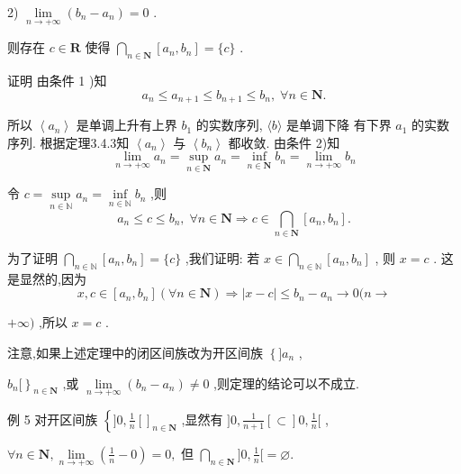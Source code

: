 2) $\mathop{\lim }\limits_{{n \rightarrow   + \infty }}\left( {{b}_{n} - {a}_{n}}\right)  = 0$ .

则存在 $c \in  \mathbf{R}$ 使得 $\mathop{\bigcap }\limits_{{n \in  \mathbf{N}}}\left\lbrack  {{a}_{n},{b}_{n}}\right\rbrack   = \{ c\}$ .

证明 由条件 1 )知
$${a}_{n} \leq  {a}_{n + 1} \leq  {b}_{n + 1} \leq  {b}_{n},\;\forall n \in  \mathbf{N}.$$

所以 $\left\langle  {a}_{n}\right\rangle$ 是单调上升有上界 ${b}_{1}$ 的实数序列, $\langle b\rangle$ 是单调下降 有下界 ${a}_{1}$ 的实数序列. 根据定理3.4.3知 $\left\langle  {a}_{n}\right\rangle$ 与 $\left\langle  {b}_{n}\right\rangle$ 都收敛. 由条件 2)知
$$\mathop{\lim }\limits_{{n \rightarrow   + \infty }}{a}_{n} = \mathop{\sup }\limits_{{n \in  \mathbf{N}}}{a}_{n} = \mathop{\inf }\limits_{{n \in  \mathbf{N}}}{b}_{n} = \mathop{\lim }\limits_{{n \rightarrow   + \infty }}{b}_{n}$$

令 $c = \mathop{\sup }\limits_{{n \in  \mathbb{N}}}{a}_{n} = \mathop{\inf }\limits_{{n \in  \mathbb{N}}}{b}_{n}$ ,则
$${a}_{n} \leq  c \leq  {b}_{n},\;\forall n \in  \mathbf{N} \Rightarrow  c \in  \mathop{\bigcap }\limits_{{n \in  \mathbf{N}}}\left\lbrack  {{a}_{n},{b}_{n}}\right\rbrack  .$$

为了证明 $\mathop{\bigcap }\limits_{{n \in  \mathbb{N}}}\left\lbrack  {{a}_{n},{b}_{n}}\right\rbrack   = \{ c\}$ ,我们证明: 若 $x \in  \mathop{\bigcap }\limits_{{n \in  \mathbb{N}}}\left\lbrack  {{a}_{n},{b}_{n}}\right\rbrack$ , 则 $x = c$ . 这是显然的,因为
$$x,c \in  \left\lbrack  {{a}_{n},{b}_{n}}\right\rbrack  \left( {\forall n \in  \mathbf{N}}\right)  \Rightarrow  \left| {x - c}\right|  \leq  {b}_{n} - {a}_{n} \rightarrow  0(n \rightarrow$$

$+ \infty )$ ,所以 $x = c$ .

注意,如果上述定理中的闭区间族改为开区间族 $\left\{  {\rbrack {a}_{n}}\right.$ ,

${\left. {b}_{n}\lbrack \right\}  }_{n \in  \mathbf{N}}$ ,或 $\mathop{\lim }\limits_{{n \rightarrow   + \infty }}\left( {{b}_{n} - {a}_{n}}\right)  \neq  0$ ,则定理的结论可以不成立.

例 5 对开区间族 $\left\{  {\rbrack 0,\frac{1}{n}{\left\lbrack  \right\rbrack  }_{n \in  \mathbf{N}}}\right.$ ,显然有 $\rbrack 0,\frac{1}{n + 1}\left\lbrack   \subset  \right\rbrack  0,\frac{1}{n}\lbrack$ ,

$\forall n \in  \mathbf{N},\mathop{\lim }\limits_{{n \rightarrow   + \infty }}\left( {\frac{1}{n} - 0}\right)  = 0,$ 但 $\mathop{\bigcap }\limits_{{n \in  \mathbf{N}}}\rbrack 0,\frac{1}{n}\lbrack  = \varnothing .$

